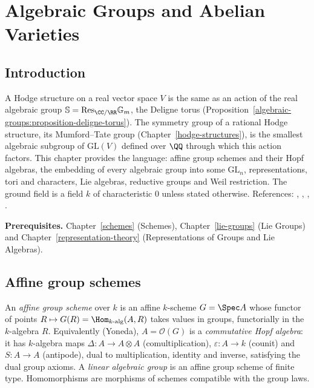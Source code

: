 \chapter{Algebraic Groups and Abelian Varieties}\label{algebraic-groups}

\section{Introduction}\label{algebraic-groups:section-introduction}

A Hodge structure on a real vector space $V$ is the same as an action of the real algebraic group $\mathbb{S} = \mathrm{Res}_{\CC/\RR}\mathbb{G}_m$, the
Deligne torus (Proposition~\ref{algebraic-groups:proposition-deligne-torus}). The symmetry group of a rational Hodge structure, its Mumford--Tate group
(Chapter~\ref{hodge-structures}), is the smallest algebraic subgroup of $\mathrm{GL}(V)$ defined over $\QQ$ through which this action factors. This chapter provides
the language: affine group schemes and their Hopf algebras, the embedding of every algebraic group into some $\mathrm{GL}_n$, representations, tori and characters,
Lie algebras, reductive groups and Weil restriction. The ground field is a field $k$ of characteristic $0$ unless stated otherwise. References:
\cite{waterhouse-affine}, \cite{milne-algebraic-groups}, \cite{borel-lag}, \cite{deligne-milne}.

\noindent\textbf{Prerequisites.} Chapter~\ref{schemes} (Schemes), Chapter~\ref{lie-groups} (Lie Groups) and Chapter~\ref{representation-theory} (Representations of
Groups and Lie Algebras).

\section{Affine group schemes}\label{algebraic-groups:section-group-schemes}

\begin{definition}\label{algebraic-groups:definition-group-scheme}
An \emph{affine group scheme} over $k$ is an affine $k$-scheme $G = \Spec A$ whose functor of points $R \mapsto G(R) = \Hom_{k\text{-alg}}(A, R)$ takes values in groups,
functorially in the $k$-algebra $R$. Equivalently (Yoneda), $A = \mathcal{O}(G)$ is a \emph{commutative Hopf algebra}: it has $k$-algebra maps
$\Delta \colon A \to A \otimes A$ (comultiplication), $\varepsilon \colon A \to k$ (counit) and $S \colon A \to A$ (antipode), dual to multiplication, identity and inverse,
satisfying the dual group axioms. A \emph{linear algebraic group} is an affine group scheme of finite type. Homomorphisms are morphisms of schemes compatible with the
group laws.
\end{definition}

